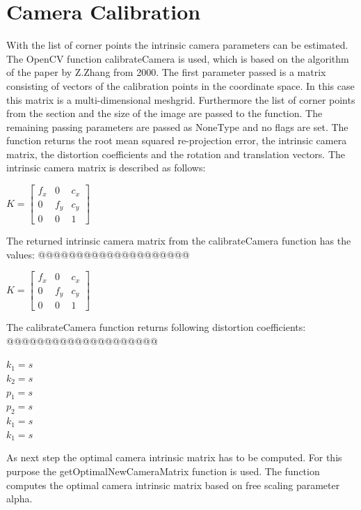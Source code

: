 \documentclass[twocolumn,10pt]{asme2ej}
\begin{document}
\section{Camera Calibration}
\label{section:calibration}
\noindent
With the list of corner points the intrinsic camera parameters can be estimated. 
The OpenCV function calibrateCamera\cite{opencv_calibrateCamera} is used, which is based on the algorithm of the paper by Z.Zhang\cite{zhang2000flexible} from 2000. 
The first parameter passed is a matrix consisting of vectors of the calibration points in the coordinate space. In this case this matrix is a multi-dimensional meshgrid. Furthermore the list of corner points from the  section and the size of the image are passed to the function. The remaining passing parameters are passed as NoneType and no flags are set. The function returns the root mean squared re-projection error, the intrinsic camera matrix, the distortion coefficients and the rotation and translation vectors.
The intrinsic camera matrix is described as follows: 
\begin{center}
    $K = \begin{bmatrix}
   f_x & 0 & c_x \\
   0 & f_y & c_y \\
   0 & 0 & 1
   \end{bmatrix}
   $
    \label{eq_intrinsicmatrix}
\end{center}
The returned intrinsic camera matrix from the calibrateCamera function has the values:
@@@@@@@@@@@@@@@@@@@@
\begin{center}
    $K = \begin{bmatrix}
   f_x & 0 & c_x \\
   0 & f_y & c_y \\
   0 & 0 & 1
\end{bmatrix}
   $
    \label{eq_calculatedintrinsicmatrix}
\end{center}
The calibrateCamera function returns following distortion coefficients:
@@@@@@@@@@@@@@@@@@@@
\begin{center}
    $k_1 = s$\\
    $k_2 = s$\\
    $p_1 = s$\\
    $p_2 = s$\\
    $k_1 = s$\\
    $k_1 = s$
    \label{eq_distcoeff}
\end{center}
As next step the optimal camera intrinsic matrix has to be computed. For this purpose the getOptimalNewCameraMatrix function\cite{opencv_getOptimalNewCameraMatrix} is used. The function computes the optimal camera intrinsic matrix based on free scaling parameter alpha.
\end{document}
